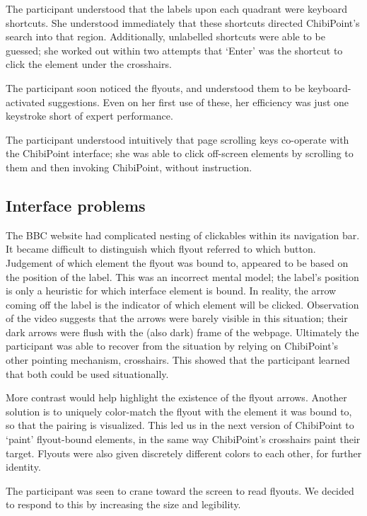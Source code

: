 \documentclass[a4paper, 12pt]{report}
\begin{document}
The participant understood that the labels upon each quadrant were keyboard shortcuts. She understood immediately that these shortcuts directed ChibiPoint's search into that region. Additionally, unlabelled shortcuts were able to be guessed; she worked out within two attempts that `Enter' was the shortcut to click the element under the crosshairs.

The participant soon noticed the flyouts, and understood them to be keyboard-activated suggestions. Even on her first use of these, her efficiency was just one keystroke short of expert performance.

The participant understood intuitively that page scrolling keys co-operate with the ChibiPoint interface; she was able to click off-screen elements by scrolling to them and then invoking ChibiPoint, without instruction.

\subsection{Interface problems}
The BBC website had complicated nesting of clickables within its navigation bar. It became difficult to distinguish which flyout referred to which button. Judgement of which element the flyout was bound to, appeared to be based on the position of the label. This was an incorrect mental model; the label's position is only a heuristic for which interface element is bound. In reality, the arrow coming off the label is the indicator of which element will be clicked. Observation of the video suggests that the arrows were barely visible in this situation; their dark arrows were flush with the (also dark) frame of the webpage. Ultimately the participant was able to recover from the situation by relying on ChibiPoint's other pointing mechanism, crosshairs. This showed that the participant learned that both could be used situationally.

More contrast would help highlight the existence of the flyout arrows. Another solution is to uniquely color-match the flyout with the element it was bound to, so that the pairing is visualized. This led us in the next version of ChibiPoint to `paint' flyout-bound elements, in the same way ChibiPoint's crosshairs paint their target. Flyouts were also given discretely different colors to each other, for further identity.

The participant was seen to crane toward the screen to read flyouts. We decided to respond to this by increasing the size and legibility.
\end{document}
